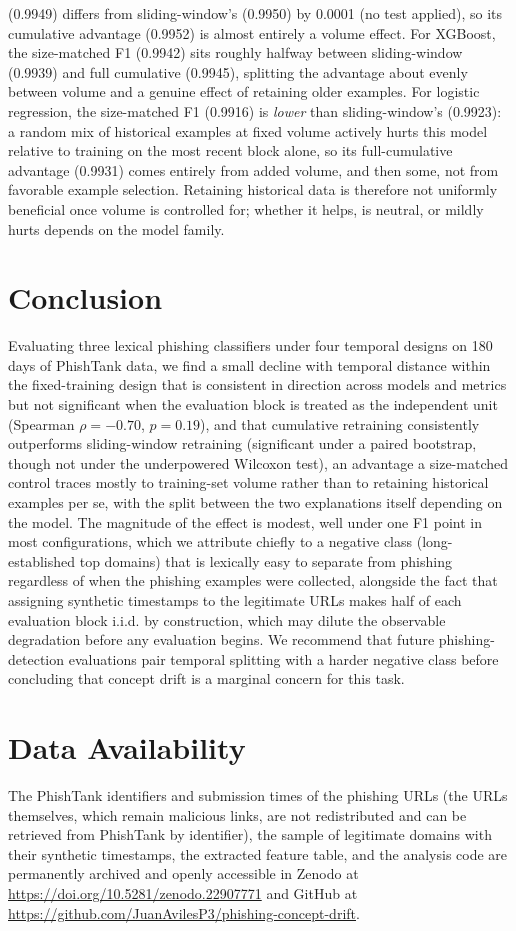 \documentclass[10pt, a4paper, oneside]{article}
\begin{document}
(0.9949) differs from sliding-window's (0.9950) by 0.0001 (no test applied), so its cumulative advantage (0.9952) is almost entirely a volume effect. For XGBoost, the size-matched F1 (0.9942) sits roughly halfway between sliding-window (0.9939) and full cumulative (0.9945), splitting the advantage about evenly between volume and a genuine effect of retaining older examples. For logistic regression, the size-matched F1 (0.9916) is \emph{lower} than sliding-window's (0.9923): a random mix of historical examples at fixed volume actively hurts this model relative to training on the most recent block alone, so its full-cumulative advantage (0.9931) comes entirely from added volume, and then some, not from favorable example selection. Retaining historical data is therefore not uniformly beneficial once volume is controlled for; whether it helps, is neutral, or mildly hurts depends on the model family.
\section{Conclusion}

Evaluating three lexical phishing classifiers under four temporal designs on 180 days of PhishTank data, we find a small decline with temporal distance within the fixed-training design that is consistent in direction across models and metrics but not significant when the evaluation block is treated as the independent unit (Spearman $\rho=-0.70$, $p=0.19$), and that cumulative retraining consistently outperforms sliding-window retraining (significant under a paired bootstrap, though not under the underpowered Wilcoxon test), an advantage a size-matched control traces mostly to training-set volume rather than to retaining historical examples per se, with the split between the two explanations itself depending on the model. The magnitude of the effect is modest, well under one F1 point in most configurations, which we attribute chiefly to a negative class (long-established top domains) that is lexically easy to separate from phishing regardless of when the phishing examples were collected, alongside the fact that assigning synthetic timestamps to the legitimate URLs makes half of each evaluation block i.i.d. by construction, which may dilute the observable degradation before any evaluation begins. We recommend that future phishing-detection evaluations pair temporal splitting with a harder negative class before concluding that concept drift is a marginal concern for this task.

\section*{Data Availability}
The PhishTank identifiers and submission times of the phishing URLs (the URLs themselves, which remain malicious links, are not redistributed and can be retrieved from PhishTank by identifier), the sample of legitimate domains with their synthetic timestamps, the extracted feature table, and the analysis code are permanently archived and openly accessible in Zenodo at \url{https://doi.org/10.5281/zenodo.22907771} and GitHub at \url{https://github.com/JuanAvilesP3/phishing-concept-drift}.
\end{document}
